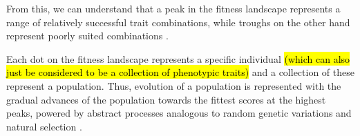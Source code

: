 From this, we can understand that a peak in the fitness landscape represents a range of relatively successful trait combinations, while troughs on the other hand represent poorly suited combinations \cite{EibenSmith2003}.

Each dot on the fitness landscape represents a specific individual \hl{(which can also just be considered to be a collection of phenotypic traits)} and a collection of these represent a population. Thus, evolution of a population is represented with the gradual advances of the population towards the fittest scores at the highest peaks, powered by abstract processes analogous to random genetic variations and natural selection \cite{EibenSmith2003}.



